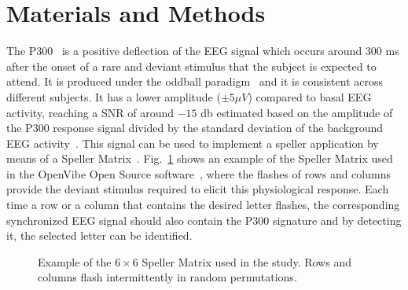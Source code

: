 \documentclass[entropy,article,submit,moreauthors,pdftex,10pt,a4paper]{mdpi}
\begin{document}
\section{Materials and Methods}

The P300~\citep{Farwell1988,Knuth2006} is a positive deflection of the EEG signal which occurs around $300$ ms after the onset of a rare and deviant stimulus that the subject is expected to attend.  It is produced under the oddball paradigm~\cite{WolpawJonathanR2012} and it is consistent across different subjects. It has a lower amplitude  ($\pm 5 \mu V $) compared to basal EEG activity, reaching a SNR of around $-15$ db estimated based on the amplitude of the P300 response signal divided by the standard deviation of the background EEG activity~\citep{Hu2010}.  This signal can be used to implement a speller application by means of a Speller Matrix~\citep{Farwell1988}. Fig.~\ref{fig:p300matrix} shows an example of the Speller Matrix used in the OpenVibe Open Source software~\citep{Renard2010}, where the flashes of rows and columns provide the deviant stimulus required to elicit this physiological response.   Each time a row or a column that contains the desired letter flashes, the corresponding synchronized EEG signal should also contain the P300 signature and by detecting it, the selected letter can be identified.

\begin{figure}[H]
\centering
{}
\caption{Example of the $6 \times 6$ Speller Matrix used in the study.  Rows and columns flash intermittently in random permutations.}
\label{fig:p300matrix}
\end{figure}
\end{document}
